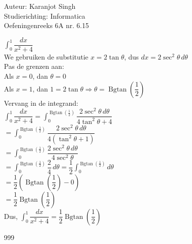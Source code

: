 \documentclass[a4paper]{article}
\begin{document}
\noindent \large Auteur: Karanjot Singh \\
\noindent \large Studierichting: Informatica \\
\noindent \large Oefeningenreeks 6A nr. 6.15 \\

\normalsize

$\displaystyle\int_{0}^{1} \dfrac{dx}{x^2 + 4}$ \\

We gebruiken de substitutie $x = 2 \tan \theta$, dus $dx = 2 \sec^2 \theta\, d\theta$ \\

Pas de grenzen aan: \\

Als $x = 0$, dan $\theta = 0$ \\

Als $x = 1$, dan $1 = 2 \tan \theta \Rightarrow \theta = \operatorname{Bgtan}\left( \dfrac{1}{2} \right)$ \\

Vervang in de integrand: \\

$\displaystyle\int_{0}^{1} \dfrac{dx}{x^2 + 4} = \displaystyle\int_{0}^{\operatorname{Bgtan}\left(\tfrac{1}{2}\right)} \dfrac{2 \sec^2 \theta\, d\theta}{4 \tan^2 \theta + 4}$ \\

$= \displaystyle\int_{0}^{\operatorname{Bgtan}\left(\tfrac{1}{2}\right)} \dfrac{2 \sec^2 \theta\, d\theta}{4(\tan^2 \theta + 1)}$ \\

$= \displaystyle\int_{0}^{\operatorname{Bgtan}\left(\tfrac{1}{2}\right)} \dfrac{2 \sec^2 \theta\, d\theta}{4 \sec^2 \theta}$ \\

$= \displaystyle\int_{0}^{\operatorname{Bgtan}\left(\tfrac{1}{2}\right)} \dfrac{2}{4}\, d\theta = \dfrac{1}{2} \displaystyle\int_{0}^{\operatorname{Bgtan}\left(\tfrac{1}{2}\right)} d\theta$ \\

$= \dfrac{1}{2} \left( \operatorname{Bgtan}\left( \dfrac{1}{2} \right) - 0 \right)$ \\

$= \dfrac{1}{2} \operatorname{Bgtan}\left( \dfrac{1}{2} \right)$ \\

Dus, $\displaystyle\int_{0}^{1} \dfrac{dx}{x^2 + 4} = \dfrac{1}{2} \operatorname{Bgtan}\left( \dfrac{1}{2} \right)$ \\

\begin{thebibliography}{999}
\end{thebibliography}
\end{document}
